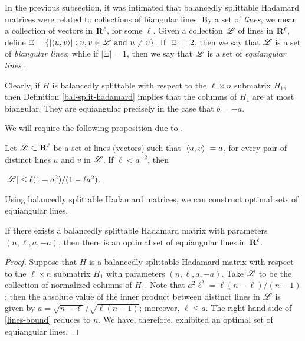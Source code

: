 \documentclass[../../../main]{subfiles}
\begin{document}
In the previous subsection, it was intimated that balancedly splittable Hadamard
matrices were related to collections of biangular lines. By a set of {\it
  lines}, we mean a collection of vectors in $\mathbf{R}^\ell$, for some $\ell$. Given a
collection $\mathscr{L}$ of lines in $\mathbf{R}^\ell$, define $\Xi=\{|\langle u,v\rangle| : u,v \in
\mathscr{L} \text{ and } u \neq v\}$. If $|\Xi|=2$, then we say that $\mathscr{L}$ is a set
of {\it biangular lines}; while if $|\Xi|=1$, then we say that $\mathscr{L}$ is a set of
{\it equiangular lines} .

Clearly, if $H$ is balancedly splittable with respect to the $\ell \times n$ submatrix $H_1$, then Definition \ref{bal-split-hadamard} implies that the columns of $H_1$ are at most biangular. They are equiangular precisely in the case that $b=-a$.

We will require the following proposition due to \cite{spherical-codes-designs}.

\begin{prop}
 Let $\mathscr{L} \subset \mathbf{R}^\ell$ be a set of lines (vectors) such that $|\langle u,v\rangle|=a$, for every pair of distinct lines $u$ and $v$ in $\mathscr{L}$. If $\ell < a^{-2}$, then
 \begin{defenum}
  \item\label{lines-bound} $|\mathscr{L}| \leq \ell(1-a^2)/(1-\ell a^2)$.
 \end{defenum}
\end{prop}

Using balancedly splittable Hadamard matrices, we can construct optimal sets of equiangular lines.

\begin{thm}
 If there exists a balancedly splittable Hadamard matrix with parameters $(n,\ell,a,-a)$, then there is an optimal set of equiangular lines in $\mathbf{R}^\ell$.
\end{thm}

\begin{proof}
 Suppose that $H$ is a balancedly splittable Hadamard matrix with respect to the $\ell \times n$ submatrix $H_1$ with parameters $(n,\ell,a,-a)$. Take $\mathscr{L}$ to be the collection of normalized columns of $H_1$. Note that $a^2\ell^2=\ell(n-\ell)/(n-1)$; then the absolute value of the inner product between distinct lines in $\mathscr{L}$ is given by $a=\sqrt{n-\ell}/\sqrt{\ell(n-1)}$; moreover, $\ell \leq a$. The right-hand side of \ref{lines-bound} reduces to $n$. We have, therefore, exhibited an optimal set of equiangular lines.
\end{proof}
\end{document}
